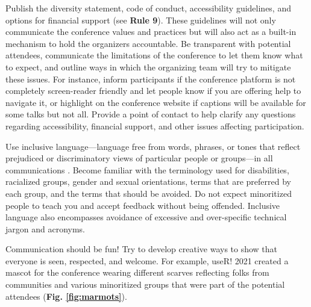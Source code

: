 \documentclass[10pt,letterpaper]{article}
\begin{document}
Publish the diversity statement, code of conduct, accessibility guidelines, and options for financial support (see \textbf{Rule 9}).
These guidelines will not only communicate the conference values and practices but will also act as a built-in mechanism to hold the organizers accountable.
Be transparent with potential attendees, communicate the limitations of the conference to let them know what to expect, and outline ways in which the organizing team will try to mitigate these issues. 
For instance, inform participants if the conference platform is not completely screen-reader friendly and let people know if you are offering help to navigate it, or highlight on the conference website if captions will be available for some talks but not all.
Provide a point of contact to help clarify any questions regarding accessibility, financial support, and other issues affecting participation.

Use inclusive language---language free from words, phrases, or tones that reflect prejudiced or discriminatory views of particular people or groups---in all communications \cite{hallDesigningDiversityInclusion2019}. 
Become familiar with the terminology used for disabilities, racialized groups, gender and sexual orientations, terms that are preferred by each group, and the terms that should be avoided.
Do not expect minoritized people to teach you and accept feedback without being offended.
Inclusive language also encompasses avoidance of excessive and over-specific technical jargon and acronyms. 

Communication should be fun! Try to develop creative ways to show that everyone is seen, respected, and welcome. 
For example, useR! 2021 created a mascot for the conference wearing different scarves reflecting folks from communities and various minoritized groups that were part of the potential attendees (\textbf{Fig. \ref{fig:marmots}}). 
\end{document}
